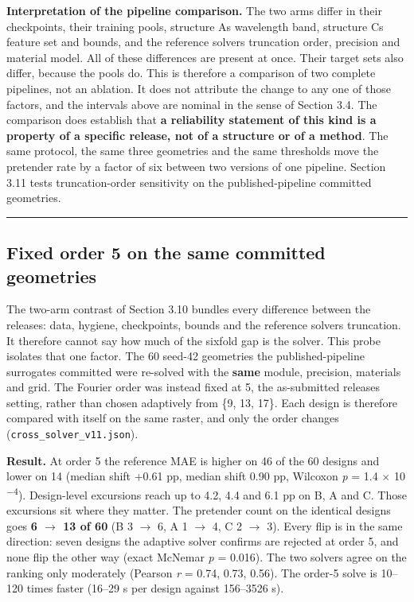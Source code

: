 \documentclass[11pt,a4paper]{article}
\newcounter{none}   %
\begin{document}
\textbf{Interpretation of the pipeline comparison.} The two arms differ in their checkpoints, their
training pools, structure A\textquotesingle s wavelength band, structure C\textquotesingle s feature set and bounds, and
the reference solver\textquotesingle s truncation order, precision and material model. All of these
differences are present at once. Their target sets also differ, because the pools do. This
is therefore a comparison of two complete pipelines, not an ablation. It does not
attribute the change to any one of those factors, and the intervals above are nominal in
the sense of Section 3.4. The comparison does establish that \textbf{a reliability statement of this kind is a property of a specific release, not of a structure or of a method}. The same
protocol, the same three geometries and the same thresholds move the pretender rate by a
factor of six between two versions of one pipeline. Section 3.11 tests truncation-order sensitivity on the published-pipeline committed geometries.

\begin{center}\rule{0.5\linewidth}{0.5pt}\end{center}

\subsection{Fixed order 5 on the same committed geometries}\label{sec:3.11}

The two-arm contrast of Section 3.10 bundles every difference between the releases: data,
hygiene, checkpoints, bounds and the reference solver\textquotesingle s truncation. It therefore cannot
say how much of the sixfold gap is the solver. This probe isolates that one factor. The 60
seed-42 geometries the published-pipeline surrogates committed were re-solved with the
\textbf{same} module, precision, materials and grid. The Fourier order was instead fixed at 5,
the as-submitted release\textquotesingle s setting, rather than chosen adaptively from \{9, 13, 17\}. Each
design is therefore compared with itself on the same raster, and only the order changes
(\texttt{cross\_\allowbreak{}solver\_\allowbreak{}v11.\allowbreak{}json}).

\textbf{Result.} At order 5 the reference MAE is higher on 46 of the 60 designs and lower on 14
(median shift +0.61 pp, median \textbar shift\textbar{} 0.90 pp, Wilcoxon \emph{p} = 1.4 \ensuremath{\times} 10\textsuperscript{\ensuremath{-}}\textsuperscript{4}). Design-level
excursions reach up to 4.2, 4.4 and 6.1 pp on B, A and C. Those excursions sit where they
matter. The pretender count on the identical designs goes \textbf{6 \ensuremath{\rightarrow} 13 of 60} (B 3 \ensuremath{\rightarrow} 6,
A 1 \ensuremath{\rightarrow} 4, C 2 \ensuremath{\rightarrow} 3). Every flip is in the same direction: seven designs the adaptive solver
confirms are rejected at order 5, and none flip the other way (exact McNemar \emph{p} = 0.016).
The two solvers agree on the ranking only moderately (Pearson \emph{r} = 0.74, 0.73, 0.56). The
order-5 solve is 10--120 times faster (16--29 s per design against 156--3526 s).
\end{document}
